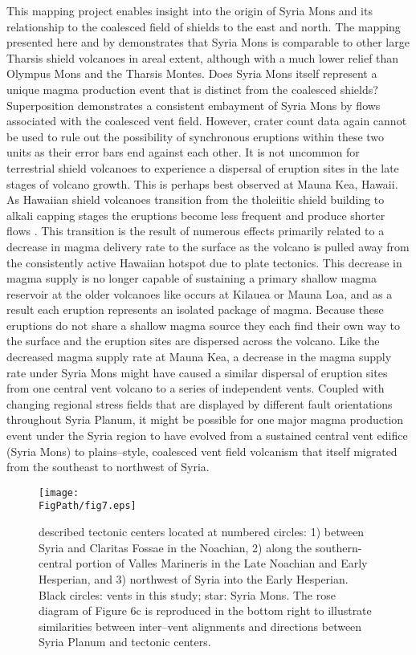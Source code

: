 This mapping project enables insight into the origin of Syria Mons and its relationship to the coalesced field of shields to the east and north.  The mapping presented here and by \citet{baptista2008swarm} demonstrates that Syria Mons is comparable to other large Tharsis shield volcanoes in areal extent, although with a much lower relief than Olympus Mons and the Tharsis Montes.  Does Syria Mons itself represent a unique magma production event that is distinct from the coalesced shields?  Superposition demonstrates a consistent embayment of Syria Mons by flows associated with the coalesced vent field.  However, crater count data again cannot be used to rule out the possibility of synchronous eruptions within these two units as their error bars end against each other. It is not uncommon for terrestrial shield volcanoes to experience a dispersal of eruption sites in the late stages of volcano growth.  This is perhaps best observed at Mauna Kea, Hawaii.  As Hawaiian shield volcanoes transition from the tholeiitic shield building to alkali capping stages the eruptions become less frequent and produce shorter flows \citep{Moore2007,Wolfe1996,Rowland2000,Bleacher2008}.  This transition is the result of numerous effects primarily related to a decrease in magma delivery rate to the surface as the volcano is pulled away from the consistently active Hawaiian hotspot due to plate tectonics.  This decrease in magma supply is no longer capable of sustaining a primary shallow magma reservoir at the older volcanoes like occurs at Kilauea or Mauna Loa, and as a result each eruption represents an isolated package of magma.  Because these eruptions do not share a shallow magma source they each find their own way to the surface and the eruption sites are dispersed across the volcano. Like the decreased magma supply rate at Mauna Kea, a decrease in the magma supply rate under Syria Mons might have caused a similar dispersal of eruption sites from one central vent volcano to a series of independent vents. Coupled with changing regional stress fields that are displayed by different fault orientations throughout Syria Planum, it might be possible for one major magma production event under the Syria region to have evolved from a sustained central vent edifice (Syria Mons) to plains--style, coalesced vent field volcanism that itself migrated from the southeast to northwest of Syria.  

\begin{figure}[ht]
\centering
\texttt{[image: \\FigPath/fig7.eps]}
\caption[Map of tectonic centers from \citet{Anderson2001}]{\citet{Anderson2001} described tectonic centers located at numbered circles: 1) between Syria and Claritas Fossae in the Noachian, 2) along the southern-central portion of Valles Marineris in the Late Noachian and Early Hesperian, and 3) northwest of Syria into the Early Hesperian. Black circles: vents in this study; star: Syria Mons. The rose diagram of Figure 6c is reproduced in the bottom right to illustrate similarities between inter--vent alignments and directions between Syria Planum and tectonic centers.}
\label{fig-andersoncenters}
\end{figure}

